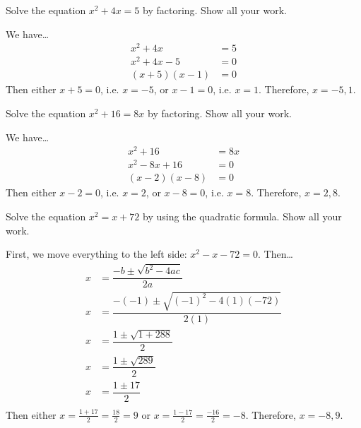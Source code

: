 \documentclass[11pt,letterpaper]{article}
\begin{document}
\newpage





 Solve the equation $x^2 + 4x= 5$ by factoring. Show all your work. \pspace

\sol We have\dots \pspace
	\[
	\begin{aligned}
	x^2 + 4x&= 5 \\[0.3cm]
	x^2 + 4x - 5&= 0 \\[0.3cm]
	(x + 5)(x - 1)&= 0
	\end{aligned}
	\] \pspace
Then either $x + 5= 0$, i.e. $x= -5$, or $x - 1=0$, i.e. $x= 1$. Therefore, $x= -5, 1$. 





\newpage





 Solve the equation $x^2 + 16= 8x$ by factoring. Show all your work. \pspace

\sol We have\dots \pspace
	\[
	\begin{aligned}
	x^2 + 16&= 8x \\[0.3cm]
	x^2 - 8x + 16&= 0 \\[0.3cm]
	(x - 2)(x - 8)&= 0
	\end{aligned}
	\] \pspace
Then either $x - 2= 0$, i.e. $x= 2$, or $x - 8= 0$, i.e. $x= 8$. Therefore, $x= 2, 8$. 





\newpage





 Solve the equation $x^2= x + 72$ by using the quadratic formula. Show all your work. \pspace

\sol First, we move everything to the left side: $x^2 - x - 72= 0$. Then\dots \pspace
	\[
	\begin{aligned}
	x&= \dfrac{-b \pm \sqrt{b^2 - 4ac}}{2a} \\[0.3cm]
	x&= \dfrac{-(-1) \pm \sqrt{(-1)^2 - 4(1)(-72)}}{2(1)} \\[0.3cm]
	x&= \dfrac{1 \pm \sqrt{1 + 288}}{2} \\[0.3cm]
	x&= \dfrac{1 \pm \sqrt{289}}{2} \\[0.3cm] 
	x&= \dfrac{1 \pm 17}{2} \\[0.3cm]
	\end{aligned}
	\] \pspace
Then either $x= \frac{1 + 17}{2}= \frac{18}{2}= 9$ or $x= \frac{1 - 17}{2}= \frac{-16}{2}= -8$. Therefore, $x= -8, 9$. 
\end{document}
